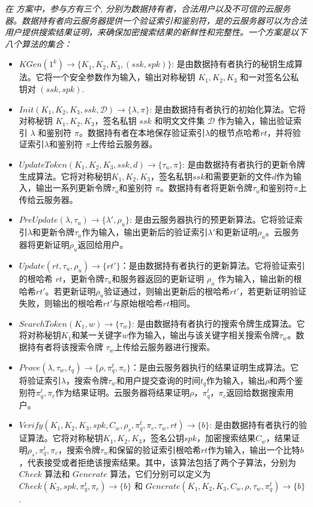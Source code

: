\begin{definition}\label{def:multi}
  {\itshape
      在 \multi 方案中，参与方有三个, 分别为数据持有者，合法用户以及不可信的云服务器。数据持有者向云服务器提供一个验证索引和鉴别符，是的云服务器可以为合法用户提供搜索结果证明，来确保加密搜索结果的新鲜性和完整性。一个\multi 方案是以下八个算法的集合：
      \begin{itemize}
        \item $KGen(1^k) \rightarrow \{K_1,K_2,K_3, (ssk, spk)\}$: 是由数据持有者执行的秘钥生成算法。它将一个安全参数作为输入，输出对称秘钥 $K_1,K_2,K_3$ 和一对签名公私钥对 $(ssk, spk)$.
        \item $Init(K_1,K_2,K_3, ssk, \mathcal{D}) \rightarrow \{\lambda,\pi\}$: 是由数据持有者执行的初始化算法。它将对称秘钥 $K_1,K_2,K_3$，签名私钥 $ssk$ 和明文文件集 $\mathcal{D}$ 作为输入，输出验证索引 $\lambda$ 和鉴别符 $\pi$。数据持有者在本地保存验证索引$\lambda$的根节点哈希$rt$，并将验证索引$\lambda$和鉴别符 $\pi$上传给云服务器。
        \item $UpdateToken(K_1,K_2,K_3, ssk, d) \rightarrow \{\tau_u, \pi\}$: 是由数据持有者执行的更新令牌生成算法。它将对称秘钥$K_1,K_2,K_3$，签名私钥$ssk$和需要更新的文件$d$作为输入，输出一系列更新令牌$\tau_u$和鉴别符 $\pi$。数据持有者将更新令牌$\tau_u$和鉴别符$\pi$上传给云服务器。
        \item $PreUpdate(\lambda, \tau_u) \rightarrow \{\lambda',\rho_u\}$: 是由云服务器执行的预更新算法。它将验证索引$\lambda$和更新令牌$\tau_u$作为输入，输出更新后的验证索引$\lambda'$和更新证明$\rho_u$。云服务器将更新证明$\rho_u$返回给用户。
        \item $Update(rt,\tau_u,\rho_u) \rightarrow \{rt'\}$：是由数据持有者执行的更新算法。它将验证索引的根哈希 $rt$，更新令牌$\tau_u$和服务器返回的更新证明 $\rho_u$ 作为输入，输出新的根哈希$rt'$。若更新证明$\rho_u$验证通过，则输出更新后的根哈希$rt'$，若更新证明验证失败，则输出的根哈希$rt'$与原始根哈希$rt$相同。
        \item $SearchToken(K_1, w) \rightarrow \{\tau_{w}\}$: 是由数据持有者执行的搜索令牌生成算法。它将对称秘钥$K_1$和某一关键字$w$作为输入，输出与该关键字相关搜索令牌$\tau_{w}$。数据持有者将该搜索令牌 $\tau_{w}$上传给云服务器进行搜索。
        \item $Prove(\lambda, \tau_{w}, t_q) \rightarrow \{\rho,\pi^t_q, \pi_c\}$：是由云服务器执行的结果证明生成算法。它将验证索引$\lambda$，搜索令牌$\tau_{w}$和用户提交查询的时间$t_q$作为输入，输出$\rho$和两个鉴别符$\pi^t_q, \pi_c$作为结果证明。云服务器将结果证明$\rho$，$\pi^t_q， \pi_c$返回给数据搜索用户。
        \item $Verify(K_1,K_2,K_3, spk, C_w, \rho_s, \pi^t_q, \pi_c, \tau_{w},rt) \rightarrow \{b\}$: 是由数据持有者执行的验证算法。它将对称秘钥$K_1,K_2,K_3$，签名公钥$spk$，加密搜索结果$C_w$，结果证明$\rho_s,\pi^t_q, \pi_c$，搜索令牌$\tau_{w}$和保留的验证索引根哈希$rt$作为输入，输出一个比特$b$，代表接受或者拒绝该搜索结果。其中，该算法包括了两个子算法，分别为 $Check$ 算法和 $Generate$ 算法，它们分别可以定义为 $Check(K_3, spk, \pi^t_q, \pi_c) \rightarrow \{b\}$ 和 $Generate(K_1,K_2,K_3,C_w,\rho,\tau_{w},\pi^t_q) \rightarrow \{b\}$.
      \end{itemize}
      }
\end{definition}

